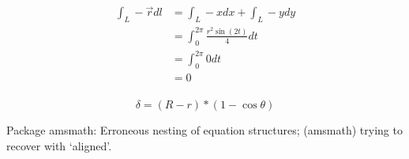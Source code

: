 \documentclass[UTF8]{book}
\begin{document}
\begin{equation}
\label{1}
\begin{split}
    \int _L - \vec r dl &=\int _L - x dx+\int _L -  y dy \\
    &=\int _0 ^{2\pi}   \frac {r^2 \sin (2t)}{4}   dt\\
    &=\int _0 ^{2\pi} 0 dt \\
   & =0\\
\end{split}
\end{equation}
 
 


\begin{equation}
\label{}
\delta = (R-r)*(1-\cos \theta)
\end{equation}
 
Package amsmath: Erroneous nesting of equation structures;
(amsmath)	trying to recover with `aligned'.
\end{document}
